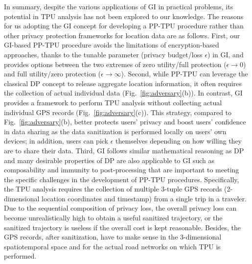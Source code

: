 \documentclass[10pt,journal,compsoc]{IEEEtran}
\begin{document}
In summary, despite the various applications of GI in  practical problems, its potential in TPU analysis has not been explored to our knowledge. The reasons for us adopting the GI concept for developing a PP-TPU procedure rather than other  privacy protection frameworks for location data are as follows.  First, our GI-based PP-TPU procedure avoids the limitations of encryption-based approaches,  thanks to the tunable parameter (privacy budget/loss $\epsilon$) in GI, and provides options between the two extremes of zero utility/full protection ($\epsilon\!\rightarrow\!0$) and full utility/zero protection ($\epsilon\!\rightarrow\!\infty$). Second, while PP-TPU can leverage the classical DP concept to release aggregate location information, it often requires the collection of actual individual data (Fig.~\ref{fig:adversary}(b)). In contrast, GI provides a framework to perform TPU analysis without collecting  actual individual GPS records (Fig.~\ref{fig:adversary}(c)). This strategy, compared to Fig.~\ref{fig:adversary}(b), better protects  users' privacy and boost users' confidence in data sharing  as the data sanitization is performed locally on users' own devices; in addition, users can pick $\epsilon$ themselves depending on how willing they are to share their data. Third, GI follows similar mathematical reasoning as DP and many desirable properties of DP are also applicable to GI such as composability and immunity to post-processing that are important to meeting the specific challenges in the development of PP-TPU procedures.  Specifically, the TPU analysis requires the collection of multiple 3-tuple GPS records (2-dimensional location coordinates and timestamp)  from a single trip in a traveler. Due to the sequential composition of privacy loss, the overall privacy loss can become unrealistically high  to obtain a useful sanitized trajectory, or the sanitized trajectory is useless if the overall cost is kept reasonable. Besides, the GPS records, after sanitization, have to make sense in the 3-dimensional spatiotemporal space and for the actual road networks on which TPU is performed. 
\end{document}
